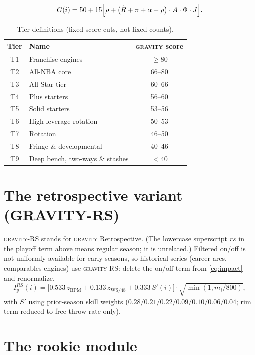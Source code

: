 \documentclass[11pt]{article}
\newcommand{\gravity}{\textsc{gravity}}
\begin{document}
\begin{equation}
G(i) = 50 + 15\Bigl[\rho + \bigl(\tilde{R} + \pi + \alpha - \rho\bigr)\cdot A \cdot \Phi \cdot J\Bigr].
\label{eq:final}
\end{equation}

\begin{table}[h]
\centering\small
\caption{Tier definitions (fixed score cuts, not fixed counts).}
\begin{tabular}{clc}
\toprule
Tier & Name & \gravity{} score \\
\midrule
T1 & Franchise engines & $\ge 80$ \\
T2 & All-NBA core & 66--80 \\
T3 & All-Star tier & 60--66 \\
T4 & Plus starters & 56--60 \\
T5 & Solid starters & 53--56 \\
T6 & High-leverage rotation & 50--53 \\
T7 & Rotation & 46--50 \\
T8 & Fringe \& developmental & 40--46 \\
T9 & Deep bench, two-ways \& stashes & $< 40$ \\
\bottomrule
\end{tabular}
\label{tab:tiers}
\end{table}

\section{The retrospective variant (GRAVITY-RS)}

\gravity-RS stands for \gravity{} Retrospective. (The lowercase superscript $rs$ in the
playoff term above means regular season; it is unrelated.) Filtered on/off is not uniformly available for early seasons, so historical series
(career arcs, comparables engines) use \gravity-RS: delete the on/off term from
\eqref{eq:impact} and renormalize,
\begin{equation}
I^{RS}_y(i) = \bigl[0.533\, z_{\mathrm{BPM}} + 0.133\, z_{\mathrm{WS/48}}
+ 0.333\, S'(i)\bigr]\cdot \sqrt{\min(1, m_i/800)},
\label{eq:rs}
\end{equation}
with $S'$ using prior-season skill weights
($0.28/0.21/0.22/0.09/0.10/0.06/0.04$; rim term reduced to free-throw rate only).

\section{The rookie module}
\end{document}
